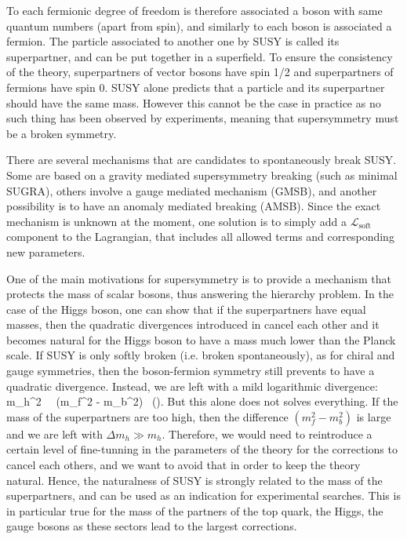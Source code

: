         To each fermionic degree of freedom is therefore associated a boson with same
        quantum numbers (apart from spin), and similarly to each boson
        is associated a fermion. The particle associated to another one by SUSY is called
        its superpartner, and can be put together in a superfield. To ensure the consistency
        of the theory, superpartners of vector bosons have spin 1/2 and superpartners
        of fermions have spin 0. SUSY alone predicts that a particle and its superpartner
        should have the same mass. However this cannot be the case in practice as no
        such thing has been observed by experiments, meaning that supersymmetry must be
        a broken symmetry.

        There are several mechanisms that are candidates to spontaneously break SUSY. Some
        are based on a gravity mediated supersymmetry breaking (such as minimal SUGRA),
        others involve a gauge mediated mechanism (GMSB), and another possibility is to
        have an anomaly mediated breaking (AMSB). Since the exact mechanism is unknown at
        the moment, one solution is to simply add a $\mathcal{L}_\text{soft}$ component to
        the Lagrangian, that includes all allowed terms and corresponding new parameters.

        One of the main motivations for supersymmetry is to provide a mechanism that
        protects the mass of scalar bosons, thus answering the hierarchy problem. In the
        case of the Higgs boson, one can show
        that if the superpartners have equal masses, then the quadratic divergences
        introduced in  cancel each other and
        it becomes natural for the Higgs boson to have a mass much lower than the Planck scale.
        If SUSY is only softly broken (i.e. broken spontaneously), as for chiral and gauge
        symmetries, then the boson-fermion symmetry still prevents to have a quadratic
        divergence. Instead, we are left with a mild logarithmic divergence:
        {
            \Delta m_h^2 \, \propto \, (m_f^2 - m_b^2) \, \left(\right).
        }
        But this alone does not solves everything. If the mass of the superpartners are
        too high, then the difference $(m_f^2 - m_b^2)$ is large and we are left with
        $\Delta m_h \gg m_h$.
        Therefore, we would need to reintroduce a certain level of fine-tunning in the
        parameters of the theory for the corrections to cancel each others, and we want
        to avoid that in order to keep the theory natural. Hence, the naturalness of SUSY
        is strongly related to the mass of the superpartners, and can be used as an indication
        for experimental searches. This is in particular true for the mass of the partners
        of the top quark, the Higgs, the gauge bosons as these sectors lead to the largest
        corrections.

